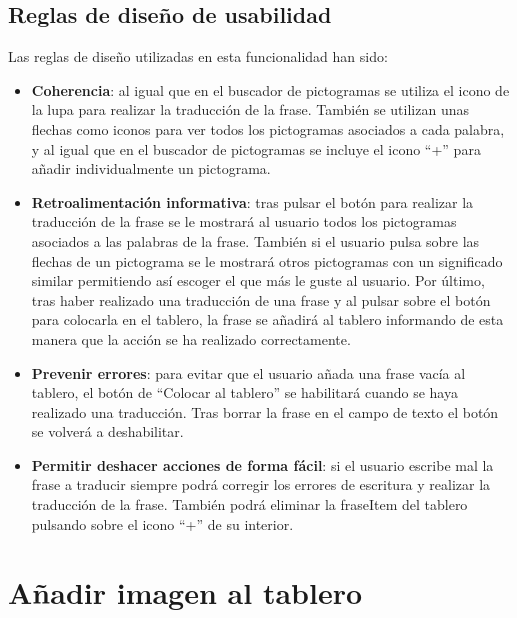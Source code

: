 \subsection{Reglas de diseño de usabilidad}
 Las reglas de diseño utilizadas en esta funcionalidad han sido:
 
\begin{itemize}
	\item \textbf{Coherencia}: al igual que en el buscador de pictogramas se utiliza el icono de la lupa para realizar la traducción de la frase. También se utilizan unas flechas como iconos para ver todos los pictogramas asociados a cada palabra, y al igual que en el buscador de pictogramas se incluye el icono “+” para añadir individualmente un pictograma.
	
	\item \textbf{Retroalimentación informativa}: tras pulsar el botón para realizar la traducción de la frase se le mostrará al usuario todos los pictogramas asociados a las palabras de la frase.  También si el usuario pulsa sobre las flechas de un pictograma se le mostrará otros pictogramas con un significado similar permitiendo así escoger el que más le guste al usuario. Por último, tras haber realizado una traducción de una frase y al pulsar sobre el botón para colocarla en el tablero, la frase se añadirá al tablero informando de esta manera que la acción se ha realizado correctamente.
	
	\item \textbf{Prevenir errores}: para evitar que el usuario añada una frase vacía al tablero, el botón de “Colocar al tablero” se habilitará cuando se haya realizado una traducción. Tras borrar la frase en el campo de texto el botón se volverá a deshabilitar.
	
	
	\item \textbf{Permitir deshacer acciones de forma fácil}: si el usuario escribe mal la frase a traducir siempre podrá corregir los errores de escritura y realizar la traducción de la frase. También podrá eliminar la fraseItem del tablero pulsando sobre el icono “+” de su interior.
	
\end{itemize}





\section{Añadir imagen al tablero}

